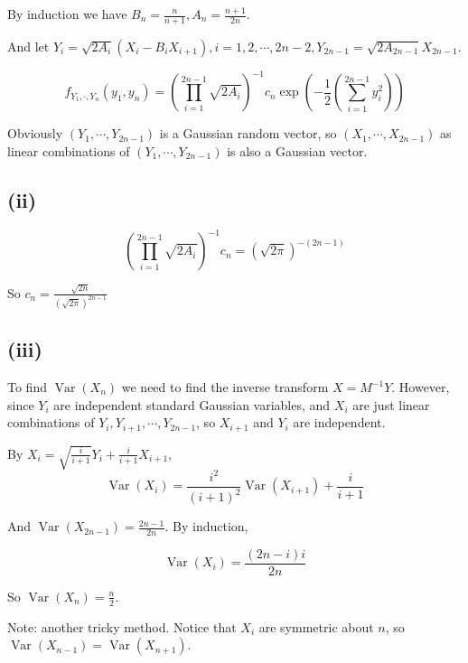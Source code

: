 \documentclass{article}
\begin{document}
By induction we have $B_n = \frac{n}{n+1},A_n = \frac{n+1}{2n}$. 

And let $Y_i = \sqrt{2A_i} ( X_i-B_i X_{i+1}),i=1,2,\cdots,2n-2,Y_{2n-1} = \sqrt{2A_{2n-1}} X_{2n-1} $. 

\begin{equation}
    f_{Y_1,\cdot,Y_n}(y_1,y_n) =\left(\prod_{i=1}^{2n-1} \sqrt{2A_i} \right)^{-1}c_n \exp\left(-\frac{1}{2}\left(\sum_{i=1}^{2n-1} y_i^2\right)\right)
\end{equation}

Obviously $(Y_1,\cdots,Y_{2n-1})$ is a Gaussian random vector, so $(X_1,\cdots,X_{2n-1})$ as linear combinations of $(Y_1,\cdots,Y_{2n-1})$ is also a Gaussian vector.

\subsection{(ii)}


\begin{equation}
    \left(\prod_{i=1}^{2n-1} \sqrt{2A_i} \right)^{-1}c_n  = (\sqrt{2\pi})^{-(2n-1)}
\end{equation}

So $c_n = \frac{\sqrt{2n}}{(\sqrt{2\pi})^{2n-1}}$

\subsection{(iii)}

To find $\operatorname{Var}(X_n)$ we need to find the inverse transform $X= M^{-1}Y$. 
However, since $Y_i$ are independent standard Gaussian variables, and $X_i $ are just linear combinations of $Y_i,Y_{i+1},\cdots, Y_{2n-1}$, so $X_{i+1}$ and $Y_i$ are independent.

By $X_i = \sqrt{\frac{i}{i+1}} Y_i + \frac{i}{i+1} X_{i+1}$,
\begin{equation}
    \operatorname{Var}(X_i) = \frac{i^2}{(i+1)^2}  \operatorname{Var}(X_{i+1}) + \frac{i}{i+1}
\end{equation}

And $\operatorname{Var}(X_{2n-1})  = \frac{2n-1}{2n}$. By induction,

\begin{equation}
    \operatorname{Var}(X_{i})  = \frac{(2n-i)i}{2n}
\end{equation}

So $\operatorname{Var}(X_{n}) = \frac{n}{2}$.

Note: another tricky method. Notice that $X_i$ are symmetric about $n$, so $\operatorname{Var}(X_{n-1}) = \operatorname{Var}(X_{n+1})$.
\end{document}
